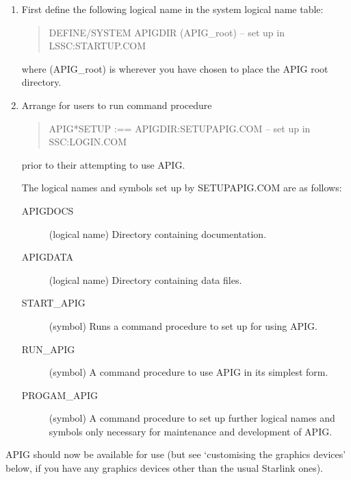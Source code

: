 \begin{enumerate}

  \item First define the following logical name in the system logical
   name table:

   \begin{verse}

DEFINE/SYSTEM  APIGDIR (APIG\_root) -- set up in LSSC:STARTUP.COM

   \end{verse}

   where (APIG\_root) is wherever you have chosen to place the APIG root
   directory.

  \item Arrange for users to run command procedure

   \begin{verse}

APIG*SETUP :== APIGDIR:SETUPAPIG.COM  -- set up in SSC:LOGIN.COM

   \end{verse}

   prior to their attempting to use APIG.


   The logical names and symbols set up by SETUPAPIG.COM are as
   follows:

   \begin{description}

     \item[APIGDOCS] (logical name) Directory containing documentation.

     \item[APIGDATA] (logical name) Directory containing data files.

     \item[START\_APIG] (symbol) Runs a command procedure to set up for
      using APIG.

     \item[RUN\_APIG] (symbol) A command procedure to use APIG in its
      simplest form.

     \item[PROGAM\_APIG] (symbol) A command procedure to set up further
      logical names and symbols only necessary for maintenance and
      development of APIG.

   \end{description}
\end{enumerate}

APIG should now be available for use (but see `customising the graphics
devices' below, if you have any graphics devices other than the usual
Starlink ones).

